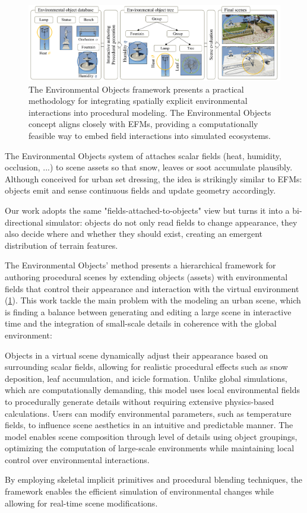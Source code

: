 \begin{figure}[H]
    \centering
    \includegraphics[]{env-objs-Grosbellet2016.png}
    \caption{The Environmental Objects framework \cite{Grosbellet2016} presents a practical methodology for integrating spatially explicit environmental interactions into procedural modeling. The Environmental Objects concept aligns closely with EFMs, providing a computationally feasible way to embed field interactions into simulated ecosystems.}
    \label{fig:env-obj-teaser-grosbellet2016}
\end{figure}

The Environmental Objects system of \citep{Grosbellet2016} attaches scalar fields (heat, humidity, occlusion, ...) to scene assets so that snow, leaves or soot accumulate plausibly. Although conceived for urban set dressing, the idea is strikingly similar to EFMs: objects emit and sense continuous fields and update geometry accordingly.

Our work adopts the same "fields-attached-to-objects" view but turns it into a bi-directional simulator: objects do not only read fields to change appearance, they also decide where and whether they should exist, creating an emergent distribution of terrain features.


The Environmental Objects' method presents a hierarchical framework for authoring procedural scenes by extending objects (assets) with environmental fields that control their appearance and interaction with the virtual environment (\cref{fig:env-obj-teaser-grosbellet2016}). This work tackle the main problem with the modeling an urban scene, which is finding a balance between generating and editing a large scene in interactive time and the integration of small-scale details in coherence with the global environment: 
\begin{Itemize}
    \Item{} Objects in a virtual scene dynamically adjust their appearance based on surrounding scalar fields, allowing for realistic procedural effects such as snow deposition, leaf accumulation, and icicle formation. Unlike global simulations, which are computationally demanding, this model uses local environmental fields to procedurally generate details without requiring extensive physics-based calculations.
    \Item{} Users can modify environmental parameters, such as temperature fields, to influence scene aesthetics in an intuitive and predictable manner. The model enables scene composition through level of details using object groupings, optimizing the computation of large-scale environments while maintaining local control over environmental interactions.
\end{Itemize}
By employing skeletal implicit primitives and procedural blending techniques, the framework enables the efficient simulation of environmental changes while allowing for real-time scene modifications. 

